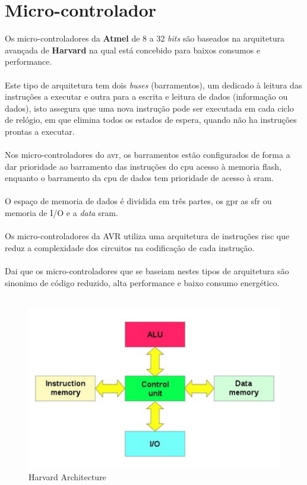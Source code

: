 \section{Micro-controlador}
Os micro-controladores da \textbf{Atmel} de 8 a 32 \textit{bits} são baseados na arquitetura avançada de \textbf{Harvard} na qual está concebido para baixos consumos e performance.
\\
\\
Este tipo de arquitetura tem dois  \textit{buses} (barramentos), um dedicado à leitura das instruções a executar e outra para a escrita e leitura de dados (informação ou dados), isto assegura que uma nova instrução pode ser executada em cada ciclo de relógio, em que elimina todos os estados de espera, quando não ha instruções prontas a executar.
\\
\\
Nos micro-controladores do \ac{avr}, os barramentos estão configurados de forma a dar prioridade ao barramento das instruções do \ac{cpu} acesso à memoria flash, enquanto o barramento da \acs{cpu} de dados tem prioridade de acesso à \ac{sram}.
\\
\\
O espaço de memoria de dados é dividida em três partes, os \ac{gpr} as \ac{sfr} ou memoria de I/O e a \textit{data} \acs{sram}.
\\
\\
Os micro-controladores da AVR utiliza uma arquitetura de instruções \ac{risc} que reduz a complexidade dos circuitos na codificação de cada instrução.
\\
\\
Dai que os micro-controladores que se baseiam nestes tipos de arquitetura são sinonimo de código reduzido, alta performance e baixo consumo energético.
\\
\\
\begin{figure}[H]
	\centering
	\includegraphics[scale=1]{./image/PESTA/Diagrama/Harvard_architecture.jpg}
	\caption{Harvard Architecture}
	\label{Harvard_architecture}
\end{figure}
